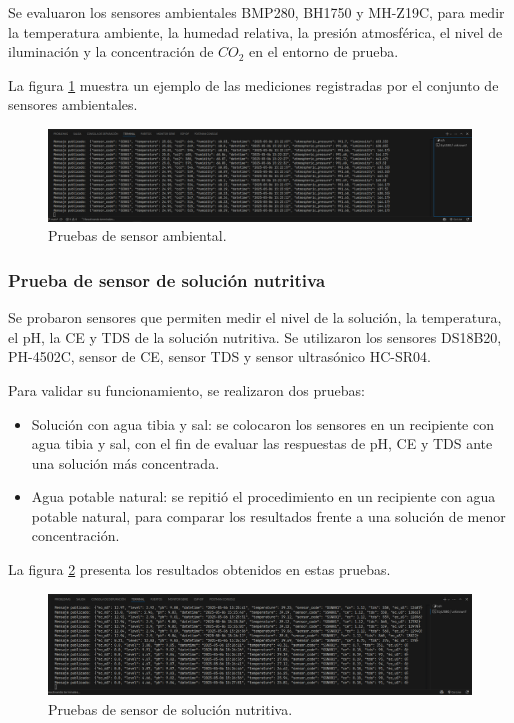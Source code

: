 Se evaluaron los sensores ambientales BMP280, BH1750 y MH-Z19C, para medir la
temperatura ambiente, la humedad relativa, la presión atmosférica, el nivel de
iluminación y la concentración de $CO_2$ en el entorno de prueba.

La figura \ref{fig:medicion_sensor_ambiental} muestra un ejemplo de las
mediciones registradas por el conjunto de sensores ambientales.

\begin{figure}[H]
    \centering
    \includegraphics[width=\textwidth]{Images/51_sensor_ambiental.png}
    \caption[Pruebas de sensor ambiental]{Pruebas de sensor ambiental.}
    \label{fig:medicion_sensor_ambiental}
\end{figure}

\subsubsection{Prueba de sensor de solución nutritiva}

Se probaron sensores que permiten medir el nivel de la solución, la
temperatura, el pH, la CE y TDS de la solución nutritiva. Se utilizaron los
sensores DS18B20, PH-4502C, sensor de CE, sensor TDS y sensor ultrasónico
HC-SR04.

Para validar su funcionamiento, se realizaron dos pruebas:

\begin{itemize}
    \item Solución con agua tibia y sal: se colocaron los sensores en un recipiente con
          agua tibia y sal, con el fin de evaluar las respuestas de pH, CE y TDS ante una
          solución más concentrada.
    \item Agua potable natural: se repitió el procedimiento en un recipiente con agua
          potable natural, para comparar los resultados frente a una solución de menor
          concentración.
\end{itemize}

La figura \ref{fig:medicion_sensor_solucion} presenta los resultados obtenidos
en estas pruebas.

\begin{figure}[H]
    \centering
    \includegraphics[width=\textwidth]{Images/52_sensor_solucion_nutritiva.png}
    \caption[Pruebas de sensor de solución nutritiva]{Pruebas de sensor de solución nutritiva.}
    \label{fig:medicion_sensor_solucion}
\end{figure}

